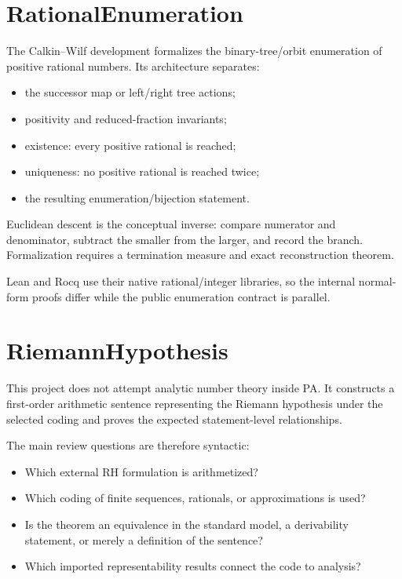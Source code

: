 \documentclass[
  10pt,
  a4paper,
  twoside,
  open=any,
  parskip=half,
  headings=big
]{scrreprt}
\begin{document}
\section{RationalEnumeration}

The Calkin--Wilf development formalizes the binary-tree/orbit enumeration of
positive rational numbers.  Its architecture separates:

\begin{itemize}
  \item the successor map or left/right tree actions;
  \item positivity and reduced-fraction invariants;
  \item existence: every positive rational is reached;
  \item uniqueness: no positive rational is reached twice;
  \item the resulting enumeration/bijection statement.
\end{itemize}

Euclidean descent is the conceptual inverse: compare numerator and denominator,
subtract the smaller from the larger, and record the branch.  Formalization
requires a termination measure and exact reconstruction theorem.

Lean and Rocq use their native rational/integer libraries, so the internal
normal-form proofs differ while the public enumeration contract is parallel.

\section{RiemannHypothesis}

This project does not attempt analytic number theory inside PA.  It constructs
a first-order arithmetic sentence representing the Riemann hypothesis under
the selected coding and proves the expected statement-level relationships.

The main review questions are therefore syntactic:

\begin{itemize}
  \item Which external RH formulation is arithmetized?
  \item Which coding of finite sequences, rationals, or approximations is used?
  \item Is the theorem an equivalence in the standard model, a derivability
        statement, or merely a definition of the sentence?
  \item Which imported representability results connect the code to analysis?
\end{itemize}
\end{document}
